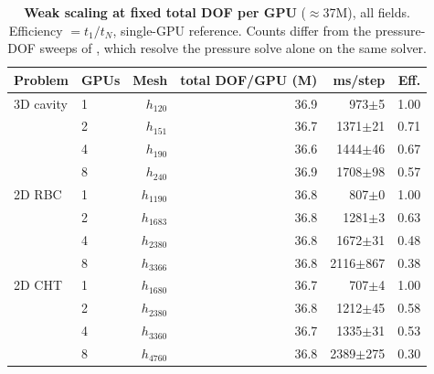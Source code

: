 \begin{table}[ht]
\centering
\caption{\textbf{Weak scaling at fixed total DOF per GPU} ($\approx$37M), all fields. Efficiency $=t_1/t_N$, single-GPU reference. Counts differ from the pressure-DOF sweeps of , which resolve the pressure solve alone on the same solver.}
\label{tab:weak}
\begin{tabular}{llrrrr}
\toprule
Problem & GPUs & Mesh & total DOF/GPU (M) & ms/step & Eff. \\
\midrule
3D cavity & 1 & $h_{120}$ & 36.9 & 973$\pm$5 & 1.00 \\
 & 2 & $h_{151}$ & 36.7 & 1371$\pm$21 & 0.71 \\
 & 4 & $h_{190}$ & 36.6 & 1444$\pm$46 & 0.67 \\
 & 8 & $h_{240}$ & 36.9 & 1708$\pm$98 & 0.57 \\
\midrule
2D RBC & 1 & $h_{1190}$ & 36.8 & 807$\pm$0 & 1.00 \\
 & 2 & $h_{1683}$ & 36.8 & 1281$\pm$3 & 0.63 \\
 & 4 & $h_{2380}$ & 36.8 & 1672$\pm$31 & 0.48 \\
 & 8 & $h_{3366}$ & 36.8 & 2116$\pm$867 & 0.38 \\
\midrule
2D CHT & 1 & $h_{1680}$ & 36.7 & 707$\pm$4 & 1.00 \\
 & 2 & $h_{2380}$ & 36.8 & 1212$\pm$45 & 0.58 \\
 & 4 & $h_{3360}$ & 36.7 & 1335$\pm$31 & 0.53 \\
 & 8 & $h_{4760}$ & 36.8 & 2389$\pm$275 & 0.30 \\
\bottomrule
\end{tabular}
\end{table}
